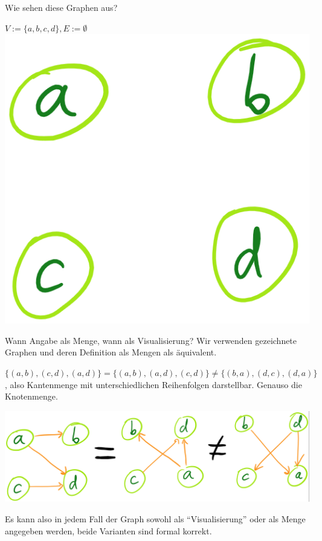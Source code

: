 \documentclass[handout]{beamer}
\begin{document}
\begin{frame}{Wie sehen diese Graphen aus?}
\begin{itemize}
		\pitem $V := \{a, b, c, d\}, E := \emptyset$\\
		\p\includegraphics[scale=0.17]{images/graph_0_03.png}
	\end{itemize}
\end{frame}

\begin{frame}{Wann Angabe als Menge, wann als Visualisierung?}
	Wir verwenden gezeichnete Graphen und deren Definition als Mengen als äquivalent.
	
	\begin{itemize}
		\pitem $\{(a,b),(c,d),(a,d)\} = \{(a,b),(a,d),(c,d)\} \neq \{(b,a),(d,c),(d,a)\}$, also Kantenmenge mit unterschiedlichen Reihenfolgen darstellbar. Genauso die Knotenmenge.
	\end{itemize}

	\ip
	\includegraphics[scale=.3]{images/graph_1.png}
	
	\bp
	
	Es kann also in jedem Fall der Graph sowohl als ``Visualisierung'' oder als Menge angegeben werden, beide Varianten sind formal korrekt.
\end{frame}
\end{document}

